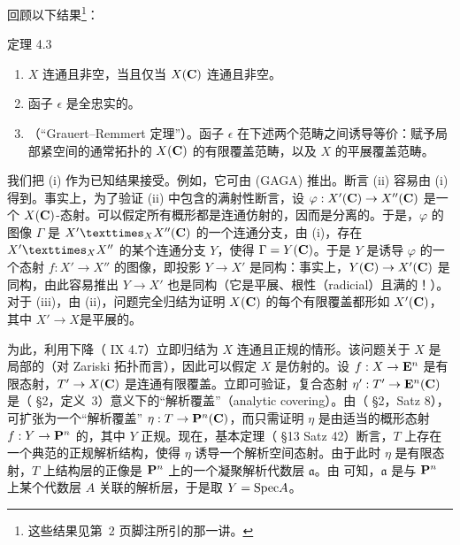 回顾以下结果\footnote{这些结果见第~2 页脚注所引的那一讲。}： %

\begin{enonce*}{定理 4.3}
\begin{enumerate}
\renewcommand{\theenumi}{\roman{enumi}}
\renewcommand{\labelenumi}{(\theenumi)}
\item $X$ 连通且非空，当且仅当 $X(\mathbf{C})$ 连通且非空。

\item 函子 $\epsilon$ 是全忠实的。

\item （“Grauert--Remmert 定理”）。函子 $\epsilon$ 在下述两个范畴之间诱导等价：赋予局部紧空间的通常拓扑的 $X(\mathbf{C})$ 的有限覆盖范畴，以及 $X$ 的平展覆盖范畴。
\end{enumerate}
\end{enonce*}

我们把 (i) 作为已知结果接受。例如，它可由 (GAGA)
\cite{sga4.exp.XI.bib.4} 推出。断言 (ii) 容易由 (i) 得到。事实上，为了验证 (ii) 中包含的满射性断言，设 $\varphi:X'(\mathbf{C})\rightarrow X''(\mathbf{C})$ 是一个 $X(\mathbf{C})$-态射。可以假定所有概形都是连通仿射的，因而是分离的。于是，$\varphi$ 的图像 $\Gamma$ 是 $\fprod{X'}{X''}{X}(\CC)$ 的一个连通分支，由 (i)，存在 $\fprod{X'}{X''}{X}$ 的某个连通分支 $Y$，使得 $\Gamma=Y(\mathbf{C})$。于是 $Y$ 是诱导 $\varphi$ 的一个态射 $f:X'\rightarrow X''$ 的图像，即投影 $Y\rightarrow X'$ 是同构：事实上，$Y(\mathbf{C})\rightarrow X'(\mathbf{C})$ 是同构，由此容易推出 $Y\rightarrow X'$ 也是同构（它是平展、根性（radicial）且满的！）。对于 (iii)，由 (ii)，问题完全归结为证明 $X(\mathbf{C})$ 的每个有限覆盖都形如 $X'(\mathbf{C})$，其中 $X'\rightarrow X$\pageoriginale 是平展的。

为此，利用下降（ IX 4.7）立即归结为
$X$ 连通且正规的情形。该问题关于 $X$ 是局部的（对 Zariski 拓扑而言），因此可以假定 $X$ 是仿射的。设 $f:X\rightarrow \mathbf{E}^n$ 是有限态射，$T'\rightarrow X(\mathbf{C})$ 是连通有限覆盖。立即可验证，复合态射 $\eta':T'\rightarrow \mathbf{E}^n(\mathbf{C})$ 是（\cite{sga4.exp.XI.bib.2} \S 2，定义~3）意义下的“解析覆盖”（analytic covering）。由（\cite{sga4.exp.XI.bib.2} \S 2，Satz 8），可扩张为一个“解析覆盖” $\eta:T\rightarrow \mathbf{P}^n(\mathbf{C})$，而只需证明 $\eta$ 是由适当的概形态射 $f:Y\rightarrow \mathbf{P}^n$ 的，其中 $Y$ 正规。现在，基本定理（\cite{sga4.exp.XI.bib.2} \S 13 Satz 42）断言，$T$ 上存在一个典范的正规解析结构，使得 $\eta$ 诱导一个解析空间态射。由于此时 $\eta$ 是有限态射，$T$ 上结构层的正像是 $\mathbf{P}^n$ 上的一个凝聚解析代数层 $\mathfrak{a}$。由  \cite{sga4.exp.XI.bib.4} %
可知，$\mathfrak{a}$ 是与 $\mathbf{P}^n$ 上某个代数层 $A$ 关联的解析层，于是取 $Y=\protect\mathcal{\operatorname{Spec}}A$。

